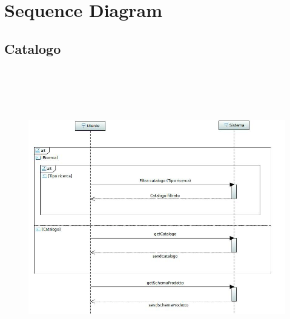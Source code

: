 \documentclass[a4paper,12pt]{report}
\begin{document}
	\chapter*{Sequence Diagram}
	\section*{Catalogo}
	\begin{figure}[h]
		\centering
		\includegraphics[width=\textwidth, height=13cm]{Sequence_Utente}
	\end{figure}
	
	\newpage
\end{document}
